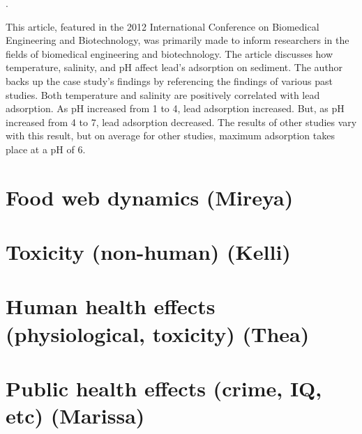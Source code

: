 \documentclass{article}\usepackage[]{graphicx}\usepackage[]{color}
\begin{document}
\medskip

\noindent {}.

\medskip

This article, featured in the 2012 International Conference on Biomedical Engineering and Biotechnology, was primarily made to inform researchers in the fields of biomedical engineering and biotechnology. The article discusses how temperature, salinity, and pH affect lead’s adsorption on sediment. The author backs up the case study’s findings by referencing the findings of various past studies. Both temperature and salinity are positively correlated with lead adsorption. As pH increased from 1 to 4, lead adsorption increased. But, as pH increased from 4 to 7, lead adsorption decreased. The results of other studies vary with this result, but on average for other studies, maximum adsorption takes place at a pH of 6. 

\medskip

\section{Food web dynamics (Mireya)}

\section{Toxicity (non-human) (Kelli)}

\section{Human health effects (physiological, toxicity) (Thea)}

\section{Public health effects (crime, IQ, etc) (Marissa)}
\end{document}
